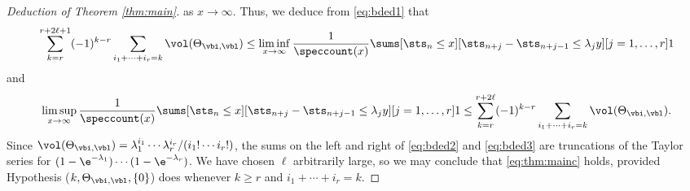 \documentclass[12pt, reqno, twoside, letterpaper]{amsart}
\begin{document}
\begin{proof}[Deduction of Theorem \ref{thm:main}]
as $x \to \infty$.
%
Thus, we deduce from \eqref{eq:bded1} that 
\begin{equation}
  \label{eq:bded2}
   \sum_{k = r}^{r + 2\ell + 1}
     (-1)^{k - r}
      \sum_{i_1 + \cdots + i_r = k}
       \vol(\Theta_{\vbi,\vbl})
        \le 
         \liminf_{x \to \infty}
          \frac{1}{\speccount(x)}
           \sums[\sts_n \le x]
                [\sts_{n + j} - \sts_{n + j - 1} \le \lambda_j y] %
                [j = 1,\ldots,r] 1
\end{equation}
and 
\begin{equation}
 \label{eq:bded3}
          \limsup_{x \to \infty}
           \frac{1}{\speccount(x)}
            \sums[\sts_n \le x]
                 [\sts_{n + j} - \sts_{n + j - 1} \le \lambda_j y] %
                 [j = 1,\ldots,r] 1
           \le 
            \sum_{k = r}^{r + 2\ell}
            (-1)^{k - r}
             \sum_{i_1 + \cdots + i_r = k}
              \vol(\Theta_{\vbi,\vbl}).            
\end{equation}
Since 
$
 \vol(\Theta_{\vbi,\vbl}) 
  = \lambda_1^{i_1}\cdots \lambda_r^{i_r}/(i_1!\cdots i_r!)
$, 
the sums on the left and right of \eqref{eq:bded2} and 
\eqref{eq:bded3} are truncations of the Taylor 
series for $(1 - \e^{-\lambda_1})\cdots (1 - \e^{-\lambda_r})$.
%
We have chosen $\ell$ arbitrarily large, so we may conclude that 
\eqref{eq:thm:mainc} holds, provided 
Hypothesis ($k,\Theta_{\vbi,\vbl},\{0\}$) does whenever 
$k \ge r$ and $i_1 + \cdots + i_r = k$.
%


\end{proof}
\end{document}
